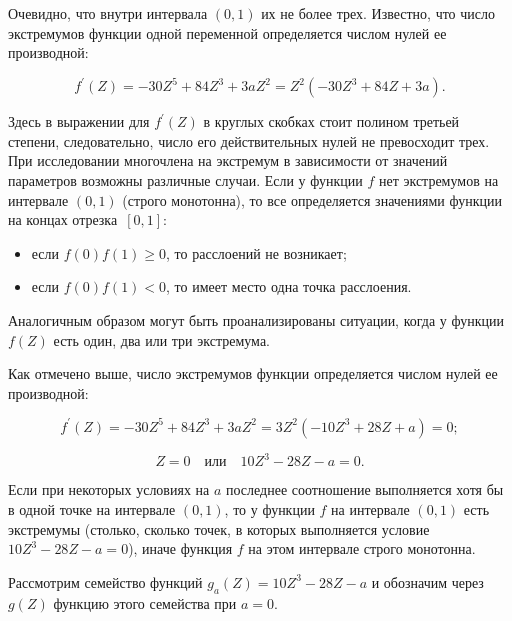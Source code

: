 Очевидно, что внутри интервала $(0, 1)$ их не более трех. Известно, что число экстремумов функции одной переменной определяется числом нулей ее производной:

$$f^{\prime}(Z)=-30Z^5+84Z^3+3aZ^2=Z^2\left(-30Z^3+84Z+3a \right).$$









\noindent

Здесь в выражении для $f^{\prime}(Z)$ в круглых скобках   стоит полином третьей степени, следовательно, число его действительных нулей не превосходит трех. При исследовании многочлена на экстремум в зависимости от значений параметров возможны различные случаи. Если  у функции $f$ нет экстремумов на интервале $(0,1)$ (строго монотонна), то все определяется значениями функции на концах отрезка~$[0,1]$:

\begin{itemize}

              \item если  $f(0)f(1)\geq 0$, то расслоений не возникает;

              \item если $f(0)f(1)<0$, то имеет место одна точка расслоения.

\end{itemize}







Аналогичным образом могут быть проанализированы ситуации, когда у функции $f(Z)$ есть один, два или три экстремума.

Как отмечено выше, число экстремумов функции определяется числом нулей ее производной:

$$f^{\prime}(Z)=-30Z^5+84Z^3+3aZ^2=3Z^2 (-10Z^3+28Z+a)=0;$$

$$Z=0 \quad  \text{или} \quad  10Z^3-28Z-a=0.$$



Если при некоторых условиях на $a$ последнее соотношение выполняется хотя бы в одной точке на интервале $(0,1)$, то у функции $f$ на интервале $(0,1)$ есть экстремумы (столько, сколько точек, в которых выполняется условие $10Z^3-28Z-a=0$), иначе функция $f$ на этом интервале строго монотонна.





Рассмотрим семейство функций $g_a(Z)=10Z^3-28Z-a$ и обозначим через $g(Z)$ функцию этого семейства при $a=0$. 

